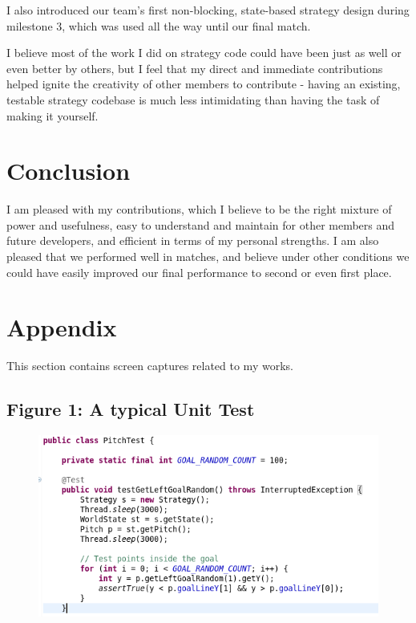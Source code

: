 \documentclass[a4paper,11pt]{article}
\begin{document}
I also introduced our team's first non-blocking, state-based strategy design during milestone 3, which was used all the way until our final match.

I believe most of the work I did on strategy code could have been just as well or even better by others, but I feel that my direct and immediate contributions helped ignite the creativity of other members to contribute - having an existing, testable strategy codebase is much less intimidating than having the task of making it yourself.


\section{Conclusion}

I am pleased with my contributions, which I believe to be the right mixture of power and usefulness, easy to understand and maintain for other members and future developers, and efficient in terms of my personal strengths. I am also pleased that we performed well in matches, and believe under other conditions we could have easily improved our final performance to second or even first place.


\section{Appendix}

This section contains screen captures related to my works.

\subsection{Figure 1: A typical Unit Test}

\begin{figure}[ht!]
\centering
\includegraphics[width=130mm]{test-example.png}
\end{figure}
\end{document}
